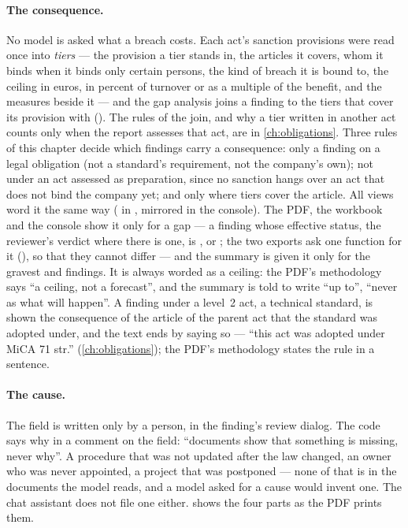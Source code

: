 \paragraph{The consequence.} No model is asked what a breach costs. Each act's sanction
provisions were read once into \emph{tiers} --- the provision a tier stands in, the articles it
covers, whom it binds when it binds only certain persons, the kind of breach it is bound to, the ceiling in euros, in percent of turnover or as a
multiple of the benefit, and the measures beside it --- and the gap analysis joins a finding to
the tiers that cover its provision with  ().
The rules of the join, and why a tier written in another act counts only when the report
assesses that act, are in \cref{ch:obligations}. Three rules of this chapter decide which
findings carry a consequence: only a finding on a legal obligation (not a standard's
requirement, not the company's own); not under an act assessed as preparation, since no
sanction hangs over an act that does not bind the company yet; and only where tiers cover the
article. All views word it the same way ( in
, mirrored in the console). The PDF, the workbook and the console
show it only for
a gap --- a finding whose effective status, the reviewer's verdict where there is one, is
,  or
; the two exports ask one function for it (), so that
they cannot differ --- and the summary is given it only for the gravest  and
 findings. It is always worded as a ceiling: the PDF's methodology says \enquote{a ceiling, not a
forecast}, and the summary is told to write \enquote{up to}, \enquote{never as what will
happen}. A finding under a level~2 act, a technical standard, is shown the consequence of
the article of the parent act that the standard was adopted under, and the text ends by
saying so --- \enquote{this act was adopted under MiCA 71 str.} (\cref{ch:obligations}); the
PDF's methodology states the rule in a sentence.

\paragraph{The cause.} The field  is written only by a person, in the finding's
review dialog. The code says why in a comment on the field: \enquote{documents show that
something is missing, never why}. A procedure that was not updated after the law changed, an
owner who was never appointed, a project that was postponed --- none of that is in the
documents the model reads, and a model asked for a cause would invent one. The chat assistant
does not file one either.  shows the four parts as the PDF prints
them.

